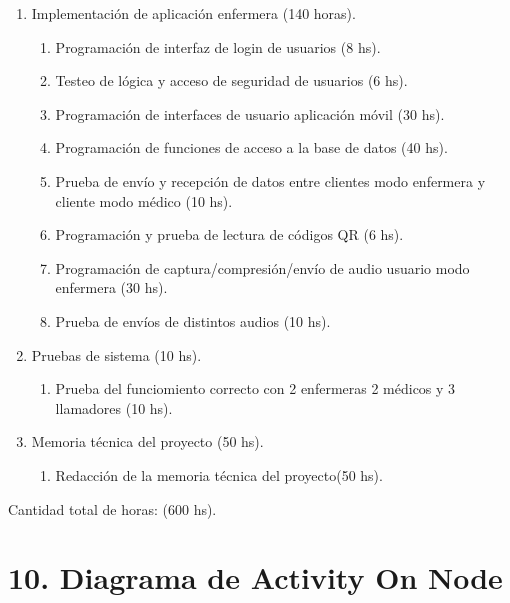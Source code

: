 \documentclass[
11pt, %
]{charter}
\begin{document}
\begin{enumerate}
\item Implementación de aplicación enfermera (140 horas).
	\begin{enumerate}
	\item Programación de interfaz de login de usuarios (8 hs).
	\item Testeo de lógica y acceso de seguridad de usuarios (6 hs).
	\item Programación de interfaces de usuario aplicación móvil (30 hs).
	\item Programación de funciones de acceso a la base de datos (40 hs).
	\item Prueba de envío y recepción de datos entre clientes modo enfermera y cliente modo médico (10 hs).
	\item Programación y prueba de lectura de códigos QR (6 hs).
	\item Programación de captura/compresión/envío de audio usuario modo enfermera (30 hs).
	\item Prueba de envíos de distintos audios (10 hs).
	\end{enumerate}
	
\item Pruebas de sistema (10 hs).
	\begin{enumerate}	
	\item Prueba del funciomiento correcto con 2 enfermeras 2 médicos y 3 llamadores (10 hs).
	\end{enumerate}	

\item Memoria técnica del proyecto (50 hs).
	\begin{enumerate}	
	\item Redacción de la memoria técnica del proyecto(50 hs).
	\end{enumerate}	
		
\end{enumerate}

Cantidad total de horas: (600 hs).

\section{10. Diagrama de Activity On Node}
\label{sec:AoN}


\end{document}
